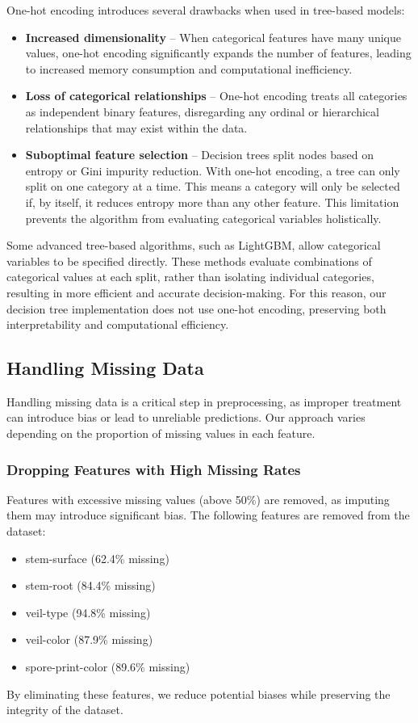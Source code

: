 \documentclass[12pt]{article}
\begin{document}
One-hot encoding introduces several drawbacks when used in tree-based models:
\begin{itemize}
    \item \textbf{Increased dimensionality} -- When categorical features have many unique values, one-hot encoding significantly expands the number of features, leading to increased memory consumption and computational inefficiency.
    \item \textbf{Loss of categorical relationships} -- One-hot encoding treats all categories as independent binary features, disregarding any ordinal or hierarchical relationships that may exist within the data.
    \item \textbf{Suboptimal feature selection} -- Decision trees split nodes based on entropy or Gini impurity reduction. With one-hot encoding, a tree can only split on one category at a time. This means a category will only be selected if, by itself, it reduces entropy more than any other feature. This limitation prevents the algorithm from evaluating categorical variables holistically.
\end{itemize}

Some advanced tree-based algorithms, such as LightGBM, allow categorical variables to be specified directly. These methods evaluate combinations of categorical values at each split, rather than isolating individual categories, resulting in more efficient and accurate decision-making. For this reason, our decision tree implementation does not use one-hot encoding, preserving both interpretability and computational efficiency.

\subsection{Handling Missing Data}
Handling missing data is a critical step in preprocessing, as improper treatment can introduce bias or lead to unreliable predictions. Our approach varies depending on the proportion of missing values in each feature.

\subsubsection{Dropping Features with High Missing Rates}
Features with excessive missing values (above 50\%) are removed, as imputing them may introduce significant bias. The following features are removed from the dataset:
\begin{itemize}
    \item stem-surface (62.4\% missing)
    \item stem-root (84.4\% missing)
    \item veil-type (94.8\% missing)
    \item veil-color (87.9\% missing)
    \item spore-print-color (89.6\% missing)
\end{itemize}
By eliminating these features, we reduce potential biases while preserving the integrity of the dataset.
\end{document}
